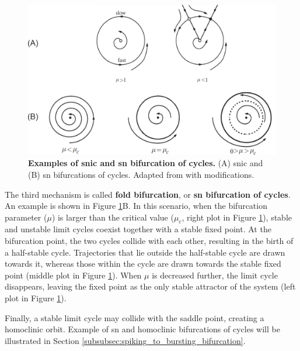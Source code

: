 \documentclass[../main.tex]{subfiles}
\begin{document}
\begin{figure}[!t]
    \centering
    \includegraphics[width=0.85\linewidth]{../img/2_mathematical_overview/bifurcation_snic_and_cycles.png}
    \caption[Examples of \gls{snic} and \gls{sn} bifurcation of cycles]{
        \textbf{Examples of \gls{snic} and \gls{sn} bifurcation of cycles.}
        (A) \gls{snic} and (B) \gls{sn} bifurcations of cycles. Adapted from \parencite{strogatzNonlinearDynamicsChaos2018} with modifications.
    }
    \label{fig:example_bifurcations_sn_snic_cycles}
\end{figure}

The third mechanism is called \textbf{fold bifurcation}, or \textbf{\gls{sn} bifurcation of cycles}. An example is shown in Figure \ref{fig:example_bifurcations_sn_snic_cycles}B. In this scenario, when the bifurcation parameter ($\mu$) is larger than the critical value ($\mu_c$, right plot in Figure \ref{fig:example_bifurcations_sn_snic_cycles}), stable and unstable limit cycles coexist together with a stable fixed point. At the bifurcation point, the two cycles collide with each other, resulting in the birth of a half-stable cycle. Trajectories that lie outside the half-stable cycle are drawn towards it, whereas those within the cycle are drawn towards the stable fixed point (middle plot in Figure \ref{fig:example_bifurcations_sn_snic_cycles}). When $\mu$ is decreased further, the limit cycle disappears, leaving the fixed point as the only stable attractor of the system (left plot in Figure \ref{fig:example_bifurcations_sn_snic_cycles}).

Finally, a stable limit cycle may collide with the saddle point, creating a homoclinic orbit. Example of \gls{sn} and homoclinic bifurcations of cycles will be illustrated in Section \ref{subsubsec:spiking_to_bursting_bifurcation}.


\end{document}
